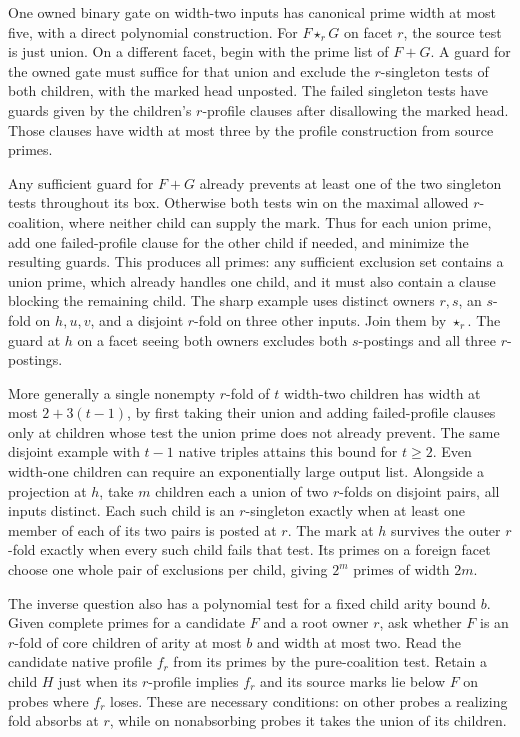 One owned binary gate on width-two inputs has canonical prime
width at most five, with a direct polynomial construction.
For $F\star_r G$ on facet $r$, the source test is just union.
On a different facet, begin with the prime list of $F+G$.
A guard for the owned gate must suffice for that union and
exclude the $r$-singleton tests of both children, with the
marked head unposted. The failed singleton tests have guards
given by the children's $r$-profile clauses after disallowing
the marked head. Those clauses have width at most three by
the profile construction from source primes.

Any sufficient guard for $F+G$ already prevents at least one
of the two singleton tests throughout its box. Otherwise both
tests win on the maximal allowed $r$-coalition, where neither
child can supply the mark. Thus for each union prime, add one
failed-profile clause for the other child if needed, and
minimize the resulting guards. This produces all primes:
any sufficient exclusion set contains a union prime, which
already handles one child, and it must also contain a clause
blocking the remaining child. The sharp example uses distinct
owners $r,s$, an $s$-fold on $h,u,v$, and a disjoint $r$-fold
on three other inputs. Join them by $\star_r$. The guard at
$h$ on a facet seeing both owners excludes both $s$-postings
and all three $r$-postings.

More generally a single nonempty $r$-fold of $t$ width-two
children has width at most $2+3(t-1)$, by first taking their
union and adding failed-profile clauses only at children
whose test the union prime does not already prevent. The
same disjoint example with $t-1$ native triples attains this
bound for $t\ge2$. Even width-one children can require an
exponentially large output list. Alongside a projection at
$h$, take $m$ children each a union of two $r$-folds on
disjoint pairs, all inputs distinct. Each such child is an
$r$-singleton exactly when at least one member of each of
its two pairs is posted at $r$. The mark at $h$ survives
the outer $r$-fold exactly when every such child fails that
test. Its primes on a foreign facet choose one whole pair
of exclusions per child, giving $2^m$ primes of width $2m$.

The inverse question also has a polynomial test for a fixed
child arity bound $b$. Given complete primes for a candidate
$F$ and a root owner $r$, ask whether $F$ is an $r$-fold of
core children of arity at most $b$ and width at most two.
Read the candidate native profile $f_r$ from its primes by
the pure-coalition test. Retain a child $H$ just when its
$r$-profile implies $f_r$ and its source marks lie below $F$
on probes where $f_r$ loses. These are necessary conditions:
on other probes a realizing fold absorbs at $r$, while on
nonabsorbing probes it takes the union of its children.

